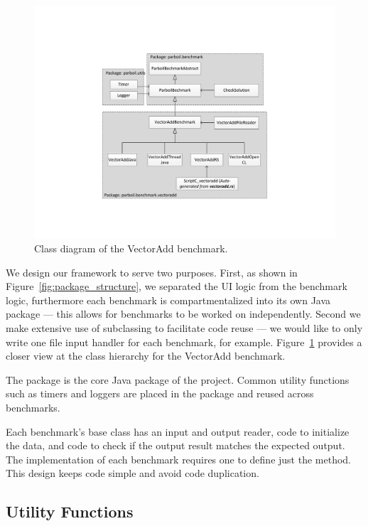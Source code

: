 \begin{figure}
\centering
\includegraphics[scale=0.5]{figs/vectoradd_class_diagram.pdf}
\caption{Class diagram of the VectorAdd benchmark.}
\label{fig:class_diagram}
\centering
\end{figure}

We design our framework to serve two purposes.
First, as shown in Figure~\ref{fig:package_structure}, we separated the UI logic from the benchmark logic, furthermore each benchmark is compartmentalized into its own Java package --- this allows for benchmarks to be worked on independently.
Second we make extensive use of subclassing to facilitate code reuse --- 
	we would like to only write one file input handler for each benchmark,
	for example.
Figure~\ref{fig:class_diagram} provides a closer
view at the class hierarchy for the VectorAdd benchmark.

The  package is the core Java package of the project.
Common utility functions such as timers and loggers are placed in the  package and reused across benchmarks.

Each benchmark's base class has an input and output reader, code to
	initialize the data, and code to check if the output result matches
	the expected output.
The implementation of each benchmark requires one to define just the 
	method.
This design keeps code simple and avoid code duplication.


\subsection{Utility Functions}

